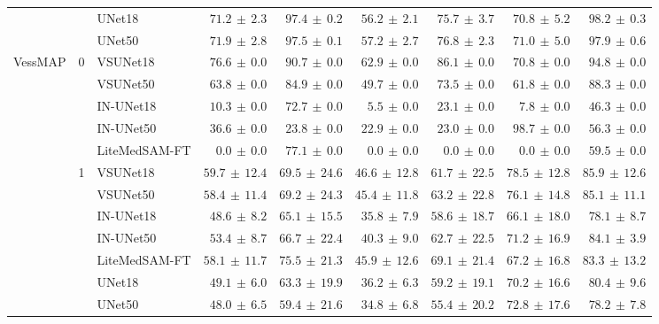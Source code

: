 \documentclass[twocolumn]{article}
\begin{document}
\begin{table}[t]
\begin{tabular}{l c l r r r r r r}
 &  & UNet18 & $71.2 \,\pm\, 2.3$ & $97.4 \,\pm\, 0.2$ & $56.2 \,\pm\, 2.1$ & $75.7 \,\pm\, 3.7$ & $70.8 \,\pm\, 5.2$ & $98.2 \,\pm\, 0.3$ \\
 &  & UNet50 & $71.9 \,\pm\, 2.8$ & $97.5 \,\pm\, 0.1$ & $57.2 \,\pm\, 2.7$ & $76.8 \,\pm\, 2.3$ & $71.0 \,\pm\, 5.0$ & $97.9 \,\pm\, 0.6$ \\
\hline
\multirow{19}{*}{VessMAP} & \multirow{5}{*}{0} & VSUNet18 & $\mathbf{76.6} \,\pm\, 0.0$ & $90.7 \,\pm\, 0.0$ & $62.9 \,\pm\, 0.0$ & $86.1 \,\pm\, 0.0$ & $70.8 \,\pm\, 0.0$ & $94.8 \,\pm\, 0.0$ \\
 &  & VSUNet50 & $63.8 \,\pm\, 0.0$ & $84.9 \,\pm\, 0.0$ & $49.7 \,\pm\, 0.0$ & $73.5 \,\pm\, 0.0$ & $61.8 \,\pm\, 0.0$ & $88.3 \,\pm\, 0.0$ \\
 &  & IN-UNet18 & $10.3 \,\pm\, 0.0$ & $72.7 \,\pm\, 0.0$ & $5.5 \,\pm\, 0.0$ & $23.1 \,\pm\, 0.0$ & $7.8 \,\pm\, 0.0$ & $46.3 \,\pm\, 0.0$ \\
 &  & IN-UNet50 & $36.6 \,\pm\, 0.0$ & $23.8 \,\pm\, 0.0$ & $22.9 \,\pm\, 0.0$ & $23.0 \,\pm\, 0.0$ & $98.7 \,\pm\, 0.0$ & $56.3 \,\pm\, 0.0$ \\
 &  & LiteMedSAM-FT & $0.0 \,\pm\, 0.0$ & $77.1 \,\pm\, 0.0$ & $0.0 \,\pm\, 0.0$ & $0.0 \,\pm\, 0.0$ & $0.0 \,\pm\, 0.0$ & $59.5 \,\pm\, 0.0$ \\
\cline{2-9}
 & \multirow{7}{*}{1} & VSUNet18 & $\mathbf{59.7} \,\pm\, 12.4$ & $69.5 \,\pm\, 24.6$ & $46.6 \,\pm\, 12.8$ & $61.7 \,\pm\, 22.5$ & $78.5 \,\pm\, 12.8$ & $85.9 \,\pm\, 12.6$ \\
 &  & VSUNet50 & $58.4 \,\pm\, 11.4$ & $69.2 \,\pm\, 24.3$ & $45.4 \,\pm\, 11.8$ & $63.2 \,\pm\, 22.8$ & $76.1 \,\pm\, 14.8$ & $85.1 \,\pm\, 11.1$ \\
 &  & IN-UNet18 & $48.6 \,\pm\, 8.2$ & $65.1 \,\pm\, 15.5$ & $35.8 \,\pm\, 7.9$ & $58.6 \,\pm\, 18.7$ & $66.1 \,\pm\, 18.0$ & $78.1 \,\pm\, 8.7$ \\
 &  & IN-UNet50 & $53.4 \,\pm\, 8.7$ & $66.7 \,\pm\, 22.4$ & $40.3 \,\pm\, 9.0$ & $62.7 \,\pm\, 22.5$ & $71.2 \,\pm\, 16.9$ & $84.1 \,\pm\, 3.9$ \\
 &  & LiteMedSAM-FT & $58.1 \,\pm\, 11.7$ & $75.5 \,\pm\, 21.3$ & $45.9 \,\pm\, 12.6$ & $69.1 \,\pm\, 21.4$ & $67.2 \,\pm\, 16.8$ & $83.3 \,\pm\, 13.2$ \\
 &  & UNet18 & $49.1 \,\pm\, 6.0$ & $63.3 \,\pm\, 19.9$ & $36.2 \,\pm\, 6.3$ & $59.2 \,\pm\, 19.1$ & $70.2 \,\pm\, 16.6$ & $80.4 \,\pm\, 9.6$ \\
 &  & UNet50 & $48.0 \,\pm\, 6.5$ & $59.4 \,\pm\, 21.6$ & $34.8 \,\pm\, 6.8$ & $55.4 \,\pm\, 20.2$ & $72.8 \,\pm\, 17.6$ & $78.2 \,\pm\, 7.8$ \\

\end{tabular}
\end{table}
\end{document}
